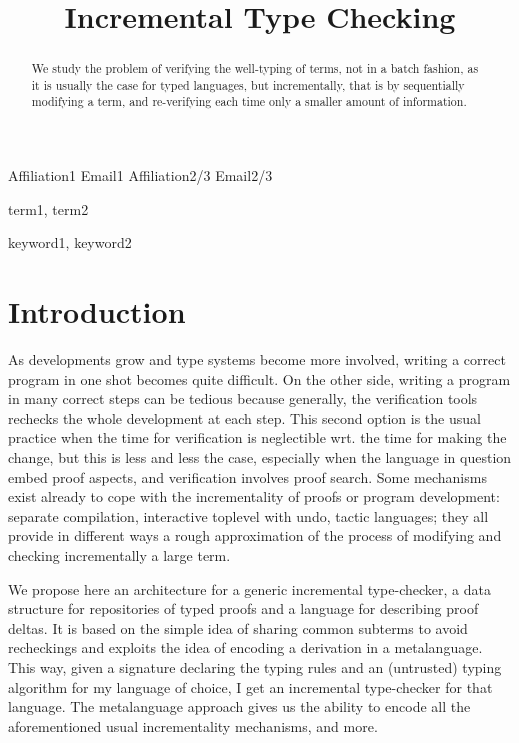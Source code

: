\documentclass[9pt,authoryear]{sigplanconf}
\begin{document}
\copyrightdata{[to be supplied]} 


\title{Incremental Type Checking}

           {Affiliation1}
           {Email1}
           {Affiliation2/3}
           {Email2/3}

\maketitle

\begin{abstract}
  We study the problem of verifying the well-typing of terms, not in a
  batch fashion, as it is usually the case for typed languages, but
  incrementally, that is by sequentially modifying a term, and
  re-verifying each time only a smaller amount of information.
\end{abstract}


\terms
term1, term2

\keywords
keyword1, keyword2

\section{Introduction}

As developments grow and type systems become more involved, writing a
correct program in one shot becomes quite difficult. On the other
side, writing a program in many correct steps can be tedious because
generally, the verification tools rechecks the whole development at
each step. This second option is the usual practice when the time for
verification is neglectible wrt. the time for making the change, but
this is less and less the case, especially when the language in
question embed proof aspects, and verification involves proof
search. Some mechanisms exist already to cope with the incrementality
of proofs or program development: separate compilation, interactive
toplevel with undo, tactic languages; they all provide in different
ways a rough approximation of the process of modifying and checking
incrementally a large term.

We propose here an architecture for a generic incremental
type-checker, a data structure for repositories of typed proofs and a
language for describing proof deltas. It is based on the simple idea
of sharing common subterms to avoid recheckings and exploits the idea
of encoding a derivation in a metalanguage. This way, given a
signature declaring the typing rules and an (untrusted) typing
algorithm for my language of choice, I get an incremental type-checker
for that language. The metalanguage approach gives us the ability to
encode all the aforementioned usual incrementality mechanisms, and
more.
\end{document}
